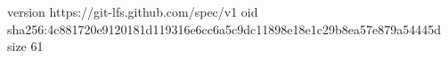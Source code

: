 version https://git-lfs.github.com/spec/v1
oid sha256:4c881720e9120181d119316e6cc6a5c9dc11898e18e1c29b8ea57e879a54445d
size 61
